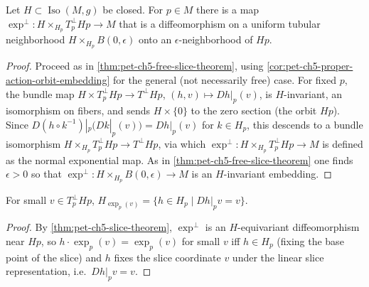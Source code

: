 \begin{theorem}
  \label{thm:pet-ch5-slice-theorem}
  Let $H\subset\operatorname{Iso}(M,g)$ be closed. For $p\in M$ there is a map
  $\exp^\perp:H\times_{H_p}T_p^\perp Hp\to M$ that is a diffeomorphism on a uniform
  tubular neighborhood $H\times_{H_p}B(0,\epsilon)$ onto an $\epsilon$-neighborhood
  of $Hp$.
\end{theorem}
\begin{proof}
  Proceed as in \cref{thm:pet-ch5-free-slice-theorem}, using
  \cref{cor:pet-ch5-proper-action-orbit-embedding} for the general (not necessarily
  free) case. For fixed $p$, the bundle map $H\times T_p^\perp Hp\to T^\perp Hp$,
  $(h,v)\mapsto Dh|_p(v)$, is $H$-invariant, an isomorphism on fibers, and sends
  $H\times\{0\}$ to the zero section (the orbit $Hp$). Since $D(h\circ
  k^{-1})|_p(Dk|_p(v))=Dh|_p(v)$ for $k\in H_p$, this descends to a bundle
  isomorphism $H\times_{H_p}T_p^\perp Hp\to T^\perp Hp$, via which
  $\exp^\perp:H\times_{H_p}T_p^\perp Hp\to M$ is defined as the normal exponential
  map. As in \cref{thm:pet-ch5-free-slice-theorem} one finds $\epsilon>0$ so that
  $\exp^\perp:H\times_{H_p}B(0,\epsilon)\to M$ is an $H$-invariant embedding.
\end{proof}

\begin{corollary}
  \label{cor:pet-ch5-isotropy-near-orbit}
  For small $v\in T_p^\perp Hp$, $H_{\exp_p(v)}=\{h\in H_p\mid Dh|_pv=v\}$.
\end{corollary}
\begin{proof}
  By \cref{thm:pet-ch5-slice-theorem}, $\exp^\perp$ is an $H$-equivariant
  diffeomorphism near $Hp$, so $h\cdot\exp_p(v)=\exp_p(v)$ for small $v$ iff
  $h\in H_p$ (fixing the base point of the slice) and $h$ fixes the slice
  coordinate $v$ under the linear slice representation, i.e.\ $Dh|_pv=v$.
\end{proof}

